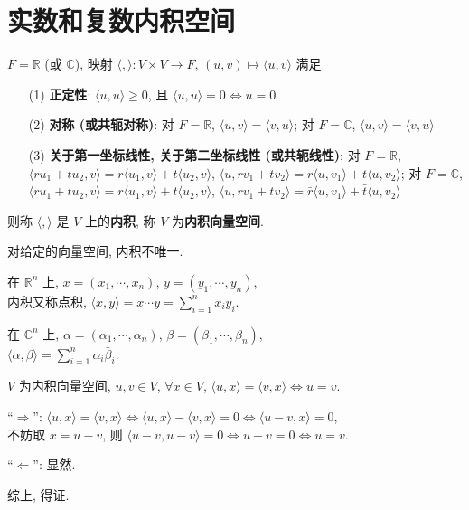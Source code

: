 \documentclass{note}
\begin{document}
\fi
\chapter{实数和复数内积空间}
\begin{df}[内积和内积空间]
    $F=\mathbb{R}$ (或 $\mathbb{C}$), 映射 $\langle,\rangle:V\times V\rightarrow F$, $(u,v)\mapsto\langle u,v\rangle$ 满足
    \begin{itemize}
        \item[(1)] \textbf{正定性}: $\langle u,u\rangle\geq 0$, 且 $\langle u,u\rangle=0\Longleftrightarrow u=0$
        \item[(2)] \textbf{对称 (或共轭对称)}: 对 $F=\mathbb{R}$, $\langle u,v\rangle=\langle v,u\rangle$; 对 $F=\mathbb{C}$, $\langle u,v\rangle=\overline{\langle v,u\rangle}$
        \item[(3)] \textbf{关于第一坐标线性, 关于第二坐标线性 (或共轭线性)}: 对 $F=\mathbb{R}$, $\langle ru_1+tu_2,v\rangle=r\langle u_1,v\rangle+t\langle u_2,v\rangle$, $\langle u,rv_1+tv_2\rangle=r\langle u,v_1\rangle+t\langle u,v_2\rangle$; 对 $F=\mathbb{C}$, $\langle ru_1+tu_2,v\rangle=r\langle u_1,v\rangle+t\langle u_2,v\rangle$, $\langle u,rv_1+tv_2\rangle=\bar{r}\langle u,v_1\rangle+\bar{t}\langle u,v_2\rangle$
    \end{itemize}
    则称 $\langle,\rangle$ 是 $V$ 上的\textbf{内积}, 称 $V$ 为\textbf{内积向量空间}.
\end{df}

对给定的向量空间, 内积不唯一.

\begin{eg}
    在 $\mathbb{R}^n$ 上, $x=(x_1,\cdots,x_n)$, $y=(y_1,\cdots,y_n)$,\\
    内积又称点积, $\langle x,y\rangle=x\cdots y=\sum_{i=1}^nx_iy_i$.
\end{eg}
\begin{eg}
    在 $\mathbb{C}^n$ 上, $\alpha=(\alpha_1,\cdots,\alpha_n)$, $\beta=(\beta_1,\cdots,\beta_n)$,\\
    $\langle\alpha,\beta\rangle=\sum_{i=1}^n\alpha_i\bar{\beta}_i$.
\end{eg}

\begin{cor}[(课本引理 9.1)]
    $V$ 为内积向量空间, $u,v\in V$, $\forall x\in V$, $\langle u,x\rangle=\langle v,x\rangle\Longleftrightarrow u=v$.
\end{cor}
\begin{pf}
    ``$\Longrightarrow$'': $\langle u,x\rangle=\langle v,x\rangle\Longleftrightarrow\langle u,x\rangle-\langle v,x\rangle=0\Longleftrightarrow\langle u-v,x\rangle=0$,\\
    不妨取 $x=u-v$, 则 $\langle u-v,u-v\rangle=0\Longleftrightarrow u-v=0\Longleftrightarrow u=v$.

    ``$\Longleftarrow$'': 显然.

    综上, 得证.
\end{pf}
\end{document}
